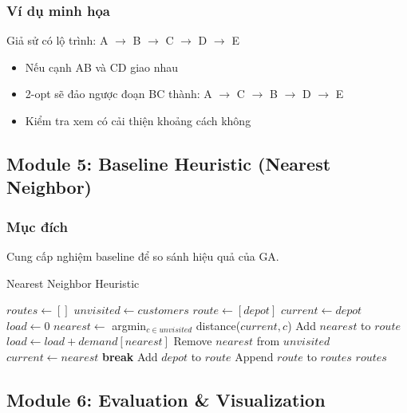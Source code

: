 \documentclass[12pt,a4paper]{article}
\begin{document}
\subsubsection{Ví dụ minh họa}

Giả sử có lộ trình: A $\rightarrow$ B $\rightarrow$ C $\rightarrow$ D $\rightarrow$ E

\begin{itemize}
    \item Nếu cạnh AB và CD giao nhau
    \item 2-opt sẽ đảo ngược đoạn BC thành: A $\rightarrow$ C $\rightarrow$ B $\rightarrow$ D $\rightarrow$ E
    \item Kiểm tra xem có cải thiện khoảng cách không
\end{itemize}

\subsection{Module 5: Baseline Heuristic (Nearest Neighbor)}

\subsubsection{Mục đích}
Cung cấp nghiệm baseline để so sánh hiệu quả của GA.

\begin{algorithm}
\caption{Nearest Neighbor Heuristic}
\begin{algorithmic}[1]
    \State $routes \gets []$
    \State $unvisited \gets customers$
        \State $route \gets [depot]$
        \State $current \gets depot$
        \State $load \gets 0$
            \State $nearest \gets$ argmin$_{c \in unvisited}$ distance($current, c$)
                \State Add $nearest$ to $route$
                \State $load \gets load + demand[nearest]$
                \State Remove $nearest$ from $unvisited$
                \State $current \gets nearest$
            \Else
                \State \textbf{break}
            \EndIf
        \EndWhile
        \State Add $depot$ to $route$
        \State Append $route$ to $routes$
    \EndWhile
    \State \Return $routes$
\EndFunction
\end{algorithmic}
\end{algorithm}

\subsection{Module 6: Evaluation \& Visualization}
\end{document}
